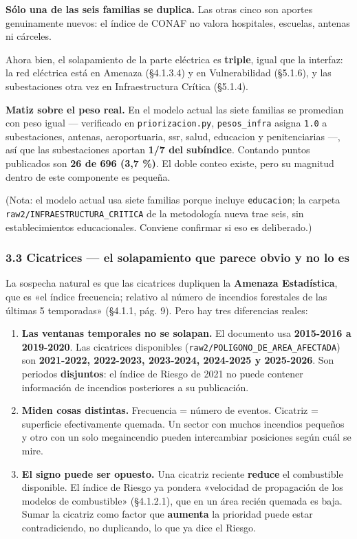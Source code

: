 \documentclass[
  spanish,
  10pt,
]{article}
\providecommand{\tightlist}{%
  \setlength{\itemsep}{0pt}\setlength{\parskip}{0pt}}
\begin{document}
\textbf{Sólo una de las seis familias se duplica.} Las otras cinco son
aportes genuinamente nuevos: el índice de CONAF no valora hospitales,
escuelas, antenas ni cárceles.

Ahora bien, el solapamiento de la parte eléctrica es \textbf{triple},
igual que la interfaz: la red eléctrica está en Amenaza (§4.1.3.4) y en
Vulnerabilidad (§5.1.6), y las subestaciones otra vez en Infraestructura
Crítica (§5.1.4).

\textbf{Matiz sobre el peso real.} En el modelo actual las siete
familias se promedian con peso igual --- verificado en
\texttt{priorizacion.py}, \texttt{pesos\_infra} asigna \texttt{1.0} a
subestaciones, antenas, aeroportuaria, ssr, salud, educacion y
penitenciarias ---, así que las subestaciones aportan \textbf{1/7 del
subíndice}. Contando puntos publicados son \textbf{26 de 696 (3,7 \%)}.
El doble conteo existe, pero su magnitud dentro de este componente es
pequeña.

(Nota: el modelo actual usa siete familias porque incluye
\texttt{educacion}; la carpeta \texttt{raw2/INFRAESTRUCTURA\_CRITICA} de
la metodología nueva trae seis, sin establecimientos educacionales.
Conviene confirmar si eso es deliberado.)

\subsubsection{\texorpdfstring{3.3 Cicatrices --- el solapamiento que
parece obvio y \textbf{no lo
es}}{3.3 Cicatrices --- el solapamiento que parece obvio y no lo es}}\label{cicatrices-el-solapamiento-que-parece-obvio-y-no-lo-es}

La sospecha natural es que las cicatrices dupliquen la \textbf{Amenaza
Estadística}, que es «el índice frecuencia; relativo al número de
incendios forestales de las últimas 5 temporadas» (§4.1.1, pág. 9). Pero
hay tres diferencias reales:

\begin{enumerate}
\def\labelenumi{\arabic{enumi}.}
\tightlist
\item
  \textbf{Las ventanas temporales no se solapan.} El documento usa
  \textbf{2015-2016 a 2019-2020}. Las cicatrices disponibles
  (\texttt{raw2/POLIGONO\_DE\_AREA\_AFECTADA}) son \textbf{2021-2022,
  2022-2023, 2023-2024, 2024-2025 y 2025-2026}. Son periodos
  \textbf{disjuntos}: el índice de Riesgo de 2021 no puede contener
  información de incendios posteriores a su publicación.
\item
  \textbf{Miden cosas distintas.} Frecuencia = número de eventos.
  Cicatriz = superficie efectivamente quemada. Un sector con muchos
  incendios pequeños y otro con un solo megaincendio pueden intercambiar
  posiciones según cuál se mire.
\item
  \textbf{El signo puede ser opuesto.} Una cicatriz reciente
  \textbf{reduce} el combustible disponible. El índice de Riesgo ya
  pondera «velocidad de propagación de los modelos de combustible»
  (§4.1.2.1), que en un área recién quemada es baja. Sumar la cicatriz
  como factor que \textbf{aumenta} la prioridad puede estar
  contradiciendo, no duplicando, lo que ya dice el Riesgo.
\end{enumerate}
\end{document}
